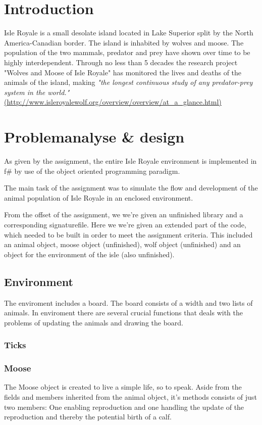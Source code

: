 \documentclass[a4paper]{report}
\begin{document}
\section*{Introduction}
Isle Royale is a small desolate island located in Lake Superior split by the North America-Canadian border. The island is inhabited by wolves and moose. The population of the two mammals, predator and prey have shown over time to be highly interdependent.
Through no less than 5 decades the research project "Wolves and Moose of Isle Royale" has monitored the lives and deaths of the animals of the island, making \textit{"the longest continuous study of any predator-prey system in the world."} \url{(http://www.isleroyalewolf.org/overview/overview/at_a_glance.html)}



\section*{Problemanalyse \& design}
As given by the assignment, the entire Isle Royale environment is implemented in f\# by use of the object oriented programming paradigm.

The main task of the assignment was to simulate the flow and development of the animal population of Isle Royale in an enclosed environment.

From the offset of the assignment, we we're given an unfinished library and a corresponding signaturefile.
Here we we're given an extended part of the code, which needed to be built in order to meet the assignment criteria.
This included an animal object, moose object (unfinished), wolf object (unfinished) and an object for the environment of the isle (also unfinished).

\subsection*{Environment}
The enviroment includes a board. The board consists of a width and two lists of animals. In enviroment there are several crucial functions that deals with the problems of updating the animals and drawing the board.

\subsubsection*{Ticks}

\subsubsection*{Moose}
The Moose object is created to live a simple life, so to speak. Aside from the fields and members inherited from the animal object, it's methods consists of just two members: One enabling reproduction and one handling the update of the reproduction and thereby the potential birth of a calf.
\end{document}

